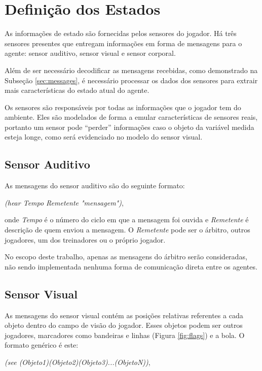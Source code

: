 \section{Definição dos Estados}
\par As informações de estado são fornecidas pelos sensores do jogador. Há três sensores presentes que entregam informações em forma de mensagens para o agente: sensor auditivo, sensor visual e sensor corporal.
\par Além de ser necessário decodificar as mensagens recebidas, como demonstrado na Subseção \ref{sec:messages}, é necessário processar os dados dos sensores para extrair mais características do estado atual do agente. 
\par Os sensores são responsáveis por todas as informações que o jogador tem do ambiente. Eles são modelados de forma a emular características de sensores reais, portanto um sensor pode ``perder'' informações caso o objeto da variável medida esteja longe, como será evidenciado no modelo do sensor visual.

\subsection{Sensor Auditivo}

As mensagens do sensor auditivo são do seguinte formato:

\noindent \textit{(hear Tempo Remetente "mensagem")},

\noindent onde \textit{Tempo} é o número do ciclo em que a mensagem foi ouvida e \textit{Remetente} é descrição de quem enviou a mensagem. O \textit{Remetente} pode ser o árbitro, outros jogadores, um dos treinadores ou o próprio jogador.

No escopo deste trabalho, apenas as mensagens do árbitro serão consideradas, não sendo implementada nenhuma forma de comunicação direta entre os agentes.

\subsection{Sensor Visual}
\label{sec:visual}
As mensagens do sensor visual contém as posições relativas referentes a cada objeto dentro do campo de visão do jogador. Esses objetos podem ser outros jogadores, marcadores como bandeiras e linhas (Figura \ref{fig:flags}) e a bola. O formato genérico é este:

\noindent \textit{(see (Objeto1)(Objeto2)(Objeto3)...(ObjetoN))},

